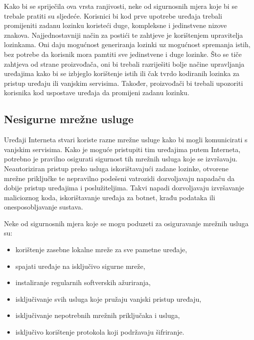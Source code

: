 \documentclass[times, utf8, diplomski]{fer}
\begin{document}
Kako bi se spriječila ova vrsta ranjivosti, neke od sigurnosnih mjera koje bi se trebale pratiti su sljedeće. Korisnici bi kod prve upotrebe uređaja trebali promijeniti zadanu lozinku koristeći duge, kompleksne i jedinstvene nizove znakova. Najjednostavniji način za postići te zahtjeve je korištenjem upravitelja lozinkama. Oni daju mogućnost generiranja lozinki uz mogućnost spremanja istih, bez potrebe da korisnik mora pamtiti sve jedinstvene i duge lozinke. Što se tiče zahtjeva od strane proizvođača, oni bi trebali razriješiti bolje načine upravljanja uređajima kako bi se izbjeglo korištenje istih ili čak tvrdo kodiranih lozinka za pristup uređaju ili vanjskim servisima. Također, proizvođači bi trebali upozoriti korisnika kod uspostave uređaja da promijeni zadanu lozinku.

\subsection{Nesigurne mrežne usluge}
Uređaji Interneta stvari koriste razne mrežne usluge kako bi mogli komunicirati s vanjskim servisima. Kako je moguće pristupiti tim uređajima putem Interneta, potrebno je pravilno osigurati sigurnost tih mrežnih usluga koje se izvršavaju. Neautoriziran pristup preko usluga iskorištavajući zadane lozinke, otvorene mrežne priključke te nepravilno podešeni vatrozidi dozvoljavaju napadaču da dobije pristup uređajima i poslužiteljima. Takvi napadi dozvoljavaju izvršavanje malicioznog koda, iskorištavanje uređaja za botnet, krađu podataka ili onesposobljavanje sustava.

Neke od sigurnosnih mjera koje se mogu poduzeti za osiguravanje mrežnih usluga su: \begin{itemize}
    \item korištenje zasebne lokalne mreže za sve pametne uređaje,
    \item spajati uređaje na isključivo sigurne mreže,
    \item instaliranje regularnih softverskih ažuriranja,
    \item isključivanje svih usluga koje pružaju vanjski pristup uređaju,
    \item isključivanje nepotrebnih mrežnih priključaka i usluga,
    \item isključivo korištenje protokola koji podržavaju šifriranje.
\end{itemize}
\end{document}
